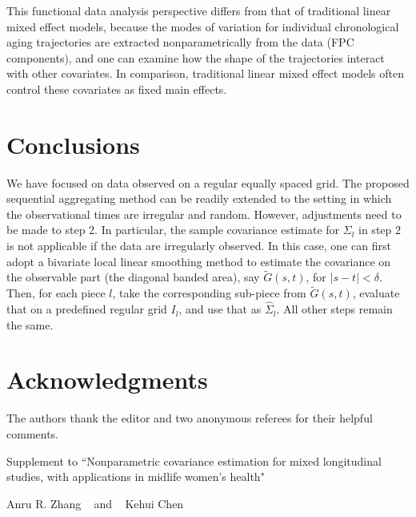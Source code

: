 \documentclass[11pt]{article}
\newcommand{\0}{{\mathbf{0}}}
\newcommand{\1}{{\mathbf{1}}}
\begin{document}
This functional data analysis perspective differs from that of traditional linear mixed effect models, because the modes of variation for individual chronological aging trajectories are extracted nonparametrically from the data (FPC components), and one can examine how the shape of the trajectories interact with other covariates. In comparison, traditional linear mixed effect models \citep{karlamangla2017evidence} often control these covariates as fixed main effects. 





\section{Conclusions}\label{sec:discussion}


We have focused on data observed on a regular equally spaced grid. The proposed sequential aggregating method can be readily extended to the setting in which the observational times are irregular and random. However, adjustments need to be made to step 2. In particular, the sample covariance estimate for $\Sigma_{l}$ in step 2 is not applicable if the data are irregularly observed. In this case, one can first adopt a bivariate local linear smoothing method \citep{yao2005functional} to estimate the covariance on the observable part (the diagonal banded area), say $\tilde G(s,t)$, for $|s-t|<\delta$. Then, for each piece $l$, take the corresponding sub-piece from $\tilde G(s,t)$, evaluate that on a predefined regular grid $I_l$, and use that as $\hat\Sigma_{l}$. All other steps remain the same. 


\section*{Acknowledgments}

The authors thank the editor and two anonymous referees for their helpful comments.




\appendix
\newpage

\setcounter{page}{1}
\setcounter{section}{0}

\begin{center}
	{\Large Supplement to ``Nonparametric covariance estimation for mixed longitudinal studies, with applications in midlife women's health"}
	
	\bigskip\medskip
	{Anru R. Zhang ~ and ~ Kehui Chen}
\end{center}
\end{document}
